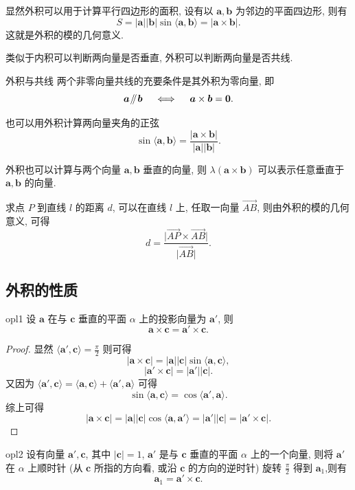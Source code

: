 \documentclass[cn,toc=twocol]{elegantbook}
\newcommand{\ve}[1]{\boldsymbol{#1}}
\newcommand{\Ve}[1]{\overrightarrow{#1}}
\newcommand{\vtimes}[2]{\ve{#1} \times \ve{#2}}
\newcommand{\parallelsum}{\mathbin{\!/\mkern-5mu/\!}}
\begin{document}
显然外积可以用于计算平行四边形的面积, 设有以 $\ve a, \ve b$ 为邻边的平面四边形, 则有
\[
	S = \lvert \ve a \rvert \lvert \ve b \rvert \sin \langle \ve a, \ve b \rangle = \lvert \vtimes{a}{b} \rvert.
\]
这就是外积的模的几何意义.

类似于内积可以判断两向量是否垂直, 外积可以判断两向量是否共线.

\begin{theorem}{外积与共线}{}
	两个非零向量共线的充要条件是其外积为零向量, 即
	\[
		\ve a \parallelsum \ve b \quad \iff \quad \ve a\times\ve b = \ve 0.
	\]
\end{theorem}
也可以用外积计算两向量夹角的正弦
\[
	\sin \langle \ve a, \ve b \rangle = \frac{\lvert \vtimes{a}{b} \rvert}{\lvert \ve a \rvert \lvert \ve b \rvert}.
\]

外积也可以计算与两个向量 $\ve a, \ve b$ 垂直的向量, 则 $\lambda (\vtimes{a}{b})$ 可以表示任意垂直于 $\ve a, \ve b$ 的向量.
\smallskip

求点 $P$ 到直线 $l$ 的距离 $d$, 可以在直线 $l$ 上, 任取一向量 $\Ve{AB}$, 则由外积的模的几何意义, 可得
\[
	d = \frac{\lvert \Ve{AP} \times \Ve{AB} \rvert}{\lvert\Ve{AB}\rvert}.
\]


\subsection{外积的性质}


\begin{lemma}{}{opl1}
设 $\ve a$ 在与 $\ve c$ 垂直的平面 $\alpha$ 上的投影向量为 $\ve a'$, 则
\[
\ve a \times \ve c = \ve a' \times \ve c.
\] 	
\end{lemma}

\begin{proof}
	显然 $\langle \ve a',\ve c \rangle = \frac{\pi}{2}$ 则可得
	\[
		\lvert \ve a \times \ve c\rvert = \lvert \ve a \rvert \lvert \ve c \rvert \sin \langle \ve a,\ve c \rangle,
	\]
	\[
		\lvert \ve a' \times \ve c\rvert = \lvert \ve a' \rvert \lvert \ve c \rvert.
	\]
	又因为 $\langle \ve a',\ve c \rangle = \langle \ve a,\ve c \rangle + \langle \ve a',\ve a \rangle$ 可得
	\[
		\sin \langle \ve a,\ve c \rangle  = \cos \langle \ve a',\ve a \rangle.
	\]
	综上可得
	\[
		\lvert \ve a \times \ve c\rvert = \lvert \ve a \rvert \lvert \ve c \rvert \cos \langle \ve a,\ve a' \rangle = \lvert \ve a' \rvert \lvert \ve c \rvert = \lvert \ve a' \times \ve c\rvert.
	\]
\end{proof}

\begin{lemma}{}{opl2}
	设有向量 $\ve a',\ve c$, 其中 $\lvert \ve c \rvert = 1$, $\ve a'$ 是与 $\ve c$ 垂直的平面 $\alpha$ 上的一个向量, 则将 $\ve a'$ 在 $\alpha$ 上顺时针 (从 $\ve c$ 所指的方向看, 或沿 $\ve c$ 的方向的逆时针) 旋转 $\frac{\pi}{2}$ 得到 $\ve a_1$,则有
	\[
		\ve a_1 = \ve a' \times \ve c.
	\]
\end{lemma}
\end{document}
